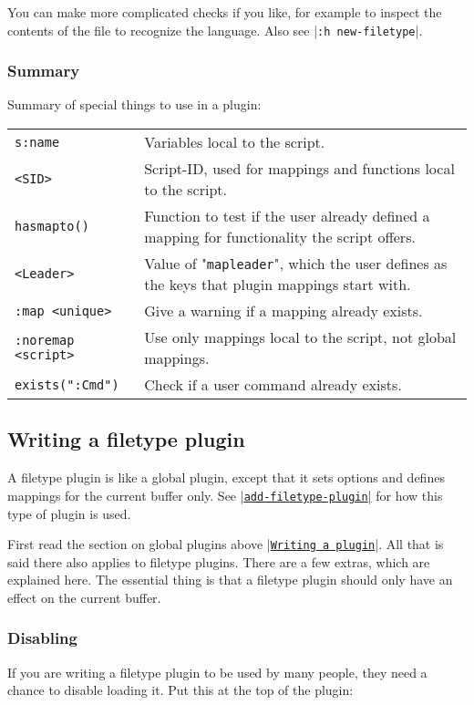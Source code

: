 You can make more complicated checks if you like, for example to inspect the contents of the file to recognize the language.
Also see |\texttt{:h new-filetype}|.
\subsubsection{Summary}
\label{plugin-special}

Summary of special things to use in a plugin:
\begin{center} \begin{tabular}{l l}
				\texttt{s:name} & Variables local to the script. \\
				\texttt{<SID>} & Script-ID, used for mappings and functions local to the script. \\
				\texttt{hasmapto()} & Function to test if the user already defined a mapping for functionality the script offers. \\
				\texttt{<Leader>} & Value of "\texttt{mapleader}", which the user defines as the keys that plugin mappings start with. \\
				\texttt{:map <unique>} & Give a warning if a mapping already exists. \\
				\texttt{:noremap <script>} & Use only mappings local to the script, not global mappings. \\
				\texttt{exists(":Cmd")} & Check if a user command already exists. \\
\end{tabular} \end{center}
\subsection{Writing a filetype plugin}
\label{write-filetype-plugin}
\label{ftplugin}
A filetype plugin is like a global plugin, except that it sets options and defines mappings for the current buffer only.
See \hyperref[add-filetype-plugin]{|\texttt{add-filetype-plugin}|} for how this type of plugin is used.

First read the section on global plugins above |\hyperref[Writing a plugin]{\texttt{Writing a plugin}}|.
All that is said there also applies to filetype plugins.
There are a few extras, which are explained here.
The essential thing is that a filetype plugin should only have an effect on the current buffer.

\subsubsection{Disabling}
If you are writing a filetype plugin to be used by many people, they need a chance to disable loading it.
Put this at the top of the plugin:


